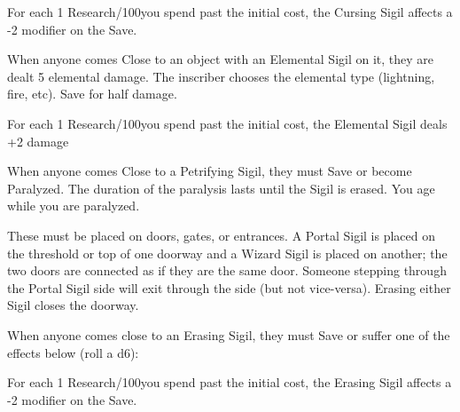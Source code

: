 {For each 1 Research/100\AG you spend past the initial cost, the Cursing Sigil affects a -2 modifier on the Save.



When anyone comes Close to an object with an Elemental Sigil on it, they are dealt 5 elemental damage.  The inscriber chooses the elemental type (lightning, fire, etc).  Save for half damage.

For each 1 Research/100\AG you spend past the initial cost, the Elemental Sigil deals +2 damage



When anyone comes Close to a Petrifying Sigil, they must Save or become Paralyzed.  The duration of the paralysis lasts until the Sigil is erased. You age while you are paralyzed.


These must be placed on doors, gates, or entrances.  A Portal Sigil is placed on the threshold or top of one doorway and a Wizard Sigil is placed on another; the two doors are connected as if they are the same door.  Someone stepping through the Portal Sigil side will exit through the  side (but not vice-versa).  Erasing either Sigil closes the doorway.

\large{}\normalsize






When anyone comes close to an Erasing Sigil, they must Save or suffer one of the effects below (roll a d6):


For each 1 Research/100\AU you spend past the initial cost, the Erasing Sigil affects a -2 modifier on the Save.

}
